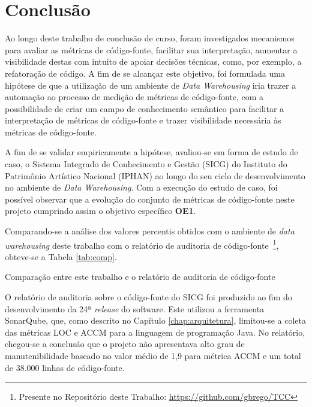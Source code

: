 \chapter{Conclusão}


Ao longo deste trabalho de conclusão de curso, foram investigados mecanismos para avaliar as métricas de código-fonte, facilitar sua interpretação, aumentar a visibilidade destas com intuito de apoiar decisões técnicas, como, por exemplo, a refatoração de código. A fim de se alcançar este objetivo, foi formulada uma hipótese de que a utilização de um ambiente de \textit{Data Warehousing} iria trazer a automação ao processo de medição de métricas de código-fonte, com a possibilidade de criar um campo de conhecimento semântico para facilitar a interpretação de métricas de código-fonte e trazer visibilidade necessária às métricas de código-fonte.


A fim de se validar empiricamente a hipótese, avaliou-se em forma de estudo de caso, o Sistema Integrado de Conhecimento e Gestão (SICG) do Instituto do Patrimônio Artístico Nacional (IPHAN) ao longo do seu ciclo de desenvolvimento no ambiente de \textit{Data Warehousing}. Com a execução do estudo de caso, foi possível observar que a evolução do conjunto de métricas de código-fonte neste projeto cumprindo assim o objetivo específico \textbf{OE1}.

Comparando-se a análise dos valores percentis obtidos com o ambiente de \textit{data warehousing} deste trabalho com o relatório de auditoria de código-fonte~\footnote{Presente no Repositório deste Trabalho: \url{https://github.com/gbrego/TCC}}, obteve-se a Tabela \ref{tab:comp}.

\begin{table}[!ht]
\centering

\caption{Comparação entre este trabalho e o relatório de auditoria de código-fonte}
\label{tab:comp}
\end{table}
\FloatBarrier

O relatório de auditoria sobre o código-fonte do SICG foi produzido ao fim do desenvolvimento da 24ª \textit{release} do software. Este utilizou a ferramenta SonarQube, que, como descrito no Capítulo \ref{chap:arquitetura}, limitou-se a coleta das métricas LOC e ACCM para a linguagem de programação Java. No relatório, chegou-se a conclusão que o projeto não apresentava alto grau de manutenibilidade baseado no valor médio de 1,9 para métrica ACCM e um total de 38.000 linhas de código-fonte. 

